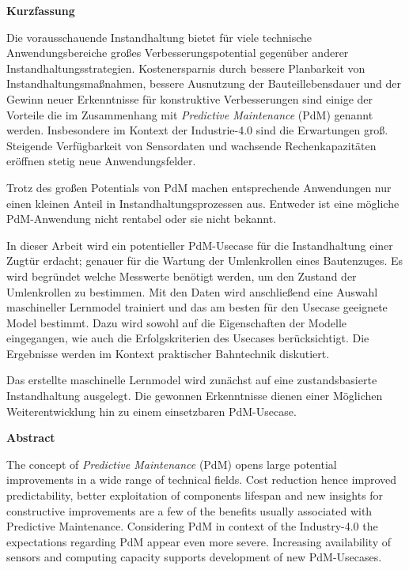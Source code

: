 \begin{center}
	\textbf{Kurzfassung}
\end{center}
\raggedright
Die vorausschauende Instandhaltung bietet für viele technische Anwendungsbereiche großes Verbesserungspotential gegenüber anderer Instandhaltungsstrategien. Kostenersparnis durch bessere Planbarkeit von Instandhaltungsmaßnahmen, bessere Ausnutzung der Bauteillebensdauer und der Gewinn neuer Erkenntnisse für konstruktive Verbesserungen sind einige der Vorteile die im Zusammenhang mit \textit{Predictive Maintenance} (PdM) genannt werden. Insbesondere im Kontext der Industrie-{4.0} sind die Erwartungen groß. Steigende Verfügbarkeit von Sensordaten und wachsende Rechenkapazitäten eröffnen stetig neue Anwendungsfelder.

Trotz des großen Potentials von PdM machen entsprechende Anwendungen nur einen kleinen Anteil in Instandhaltungsprozessen aus. Entweder ist eine mögliche PdM-Anwendung nicht rentabel oder sie nicht bekannt.

In dieser Arbeit wird ein potentieller PdM-Usecase für die Instandhaltung einer Zugtür erdacht; genauer für die Wartung der Umlenkrollen eines Bautenzuges. Es wird begründet welche Messwerte benötigt werden, um den Zustand der Umlenkrollen zu bestimmen. Mit den Daten wird anschließend eine Auswahl maschineller Lernmodel trainiert und das am besten für den Usecase geeignete Model bestimmt. Dazu wird sowohl auf die Eigenschaften der Modelle eingegangen, wie auch die Erfolgskriterien des Usecases berücksichtigt. Die Ergebnisse werden im Kontext praktischer Bahntechnik diskutiert.

Das erstellte maschinelle Lernmodel wird zunächst auf eine zustandsbasierte Instandhaltung ausgelegt. Die gewonnen Erkenntnisse dienen einer Möglichen Weiterentwicklung hin zu einem einsetzbaren PdM-Usecase.
\clearpage
\begin{center}
	\textbf{Abstract}
\end{center}
\raggedright
The concept of \textit{Predictive Maintenance} (PdM) opens large potential improvements in a wide range of technical fields. Cost reduction hence improved predictability, better exploitation of components lifespan and new insights for constructive improvements are a few of the benefits usually associated with Predictive Maintenance. Considering PdM in context of the Industry-{4.0} the expectations regarding PdM appear even more severe. Increasing availability of sensors and computing capacity supports development of new PdM-Usecases.

